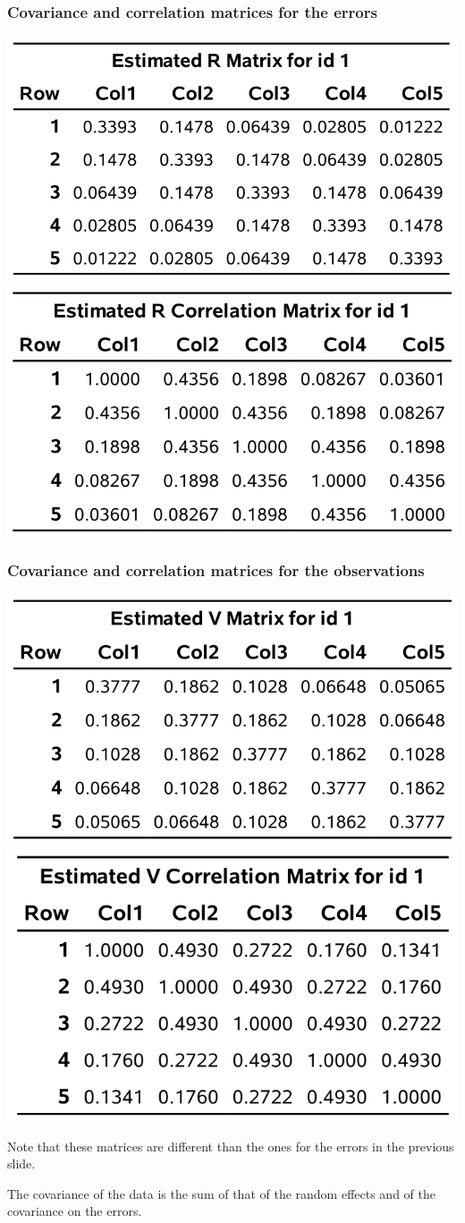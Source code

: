 \documentclass{beamer}
\begin{document}
\begin{frame}[fragile]
\frametitle{Covariance and correlation matrices for the \textbf{errors}}
\begin{center}
\includegraphics[width=0.49\linewidth]{img/c6/slides7-e13}
\includegraphics[width=0.48\linewidth]{img/c6/slides7-e14}
\end{center}

\end{frame}

\begin{frame}[fragile]
\frametitle{Covariance and correlation matrices for the \textbf{observations}}
\begin{center}
\includegraphics[width=0.50\linewidth]{img/c6/slides7-e15}
\includegraphics[width=0.46\linewidth]{img/c6/slides7-e16}
\end{center}
\bi
\item Note that these matrices are different than the ones for the errors in the previous slide.
\item The covariance of the \alert{data} is the sum of that of the random effects and of the covariance on the errors.
\ei
\end{frame}
\end{document}

